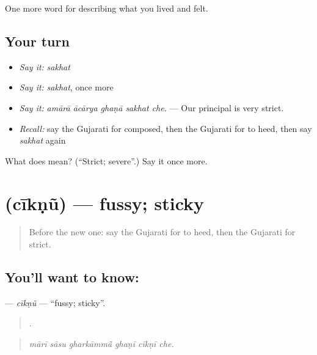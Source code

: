 \begin{grammarlens}[title={What you've built}]
One more word for describing what you lived and felt.
\end{grammarlens}

\subsection*{Your turn}
\begin{itemize}
\raggedright
  \item \emph{Say it:} \emph{sakhat}
  \item \emph{Say it:} \emph{sakhat}, once more
  \item \emph{Say it:} \emph{amārā ācārya ghaṇā sakhat che.} — Our principal is very strict.
  \item \emph{Recall:} say the Gujarati for composed, then the Gujarati for to heed, then say \emph{sakhat} again
\end{itemize}

\begin{tcolorbox}[breakable,colback=teal!4,colframe=teal!35!black,title={Before you move on}]
What does  mean? (\textquotedblleft{}Strict; severe\textquotedblright{}.) Say it once more.
\end{tcolorbox}
\section[\texorpdfstring{\gu{ચીકણું} (cīkṇũ)}{ચીકણું (cīkṇũ)}]{ (cīkṇũ) — fussy; sticky}

\label{lesson:GU-C465-ciknu}



\begin{quote}
Before the new one: say the Gujarati for to heed, then the Gujarati for strict.
\end{quote}

\subsection*{You'll want to know: }
\textbf{} — \emph{cīkṇũ} — \textquotedblleft{}fussy; sticky\textquotedblright{}.

\begin{quote}
     .
\end{quote}

\begin{quote}
\emph{mārī sāsu gharkāmmā̃ ghaṇī cīkṇī che.}
\end{quote}

